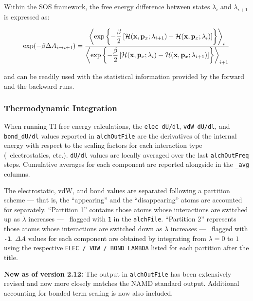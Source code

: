 Within the SOS framework, the free energy difference between states $\lambda_i$ and
$\lambda_{i+1}$ is expressed as:


\begin{equation}
\exp(-\beta \Delta A_{i \rightarrow i+1})  =
\frac{\displaystyle
      \left\langle \exp\left\{-\frac{\beta}{2}
                       \left[
                       {\cal H}({\bf x}, {\bf p}_x; \lambda_{i+1}) - {\cal H}({\bf x}, {\bf p}_x; \lambda_i)
                       \right]
                       \right\}
      \right\rangle_i}
      {\displaystyle
       \left\langle \exp\left\{-\frac{\beta}{2}
                       \left[
                       {\cal H}({\bf x}, {\bf p}_x; \lambda_i) - {\cal H}({\bf x}, {\bf p}_x; \lambda_{i+1})
                       \right]
                       \right\}
      \right\rangle_{i+1}}
\label{sos}
\end{equation}

\noindent and can be readily used with the statistical information provided by the forward and the backward runs.


\subsubsection{Thermodynamic Integration }

When running TI free energy calculations, the {\tt elec\_dU/dl}, 
{\tt vdW\_dU/dl}, and {\tt bond\_dU/dl} values reported in {\tt alchOutFile} 
are the derivatives of the internal energy with respect to the scaling factors 
for each interaction type (\ie~electrostatics, etc.). {\tt dU/dl} values are 
locally averaged over the last {\tt alchOutFreq} steps. Cumulative
averages for each component are reported alongside in the {\tt \_avg} columns.

The electrostatic, vdW, and bond values are separated following a partition 
scheme --- that is, the ``appearing'' and the ``disappearing'' atoms are 
accounted for separately. ``Partition 1'' contains those atoms whose 
interactions are switched up as $\lambda$ increases --- \ie~flagged with 
{\tt 1} in the {\tt alchFile}. ``Partition 2'' represents those atoms whose 
interactions are switched down as $\lambda$ increases --- \ie~flagged with 
{\tt -1}. $\Delta A$ values for each component are obtained by integrating from
$\lambda=0$ to $1$ using the respective {\tt ELEC / VDW / BOND LAMBDA} listed 
for each partition after the title.

{\bf New as of version 2.12:} The output in {\tt alchOutFile} has been 
extensively revised and now more closely matches the NAMD standard output.
Additional accounting for bonded term scaling is now also included.

